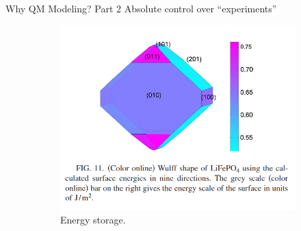 \documentclass[aspectratio=169]{beamer}
\begin{document}
\begin{frame}{Why QM Modeling? Part 2}
Absolute control over “experiments”
\begin{figure}
    \centering
    \begin{subfigure}{0.4\linewidth}
    \includegraphics[width=\linewidth]{lectures/figures/0.4_LFP_surface.png}
    \caption{Energy storage.\cite{wangFirstprinciplesStudySurface2007}}    
    \end{subfigure}
    \begin{subfigure}{0.2\linewidth}

\end{subfigure}
\end{figure}
\end{frame}
\end{document}
